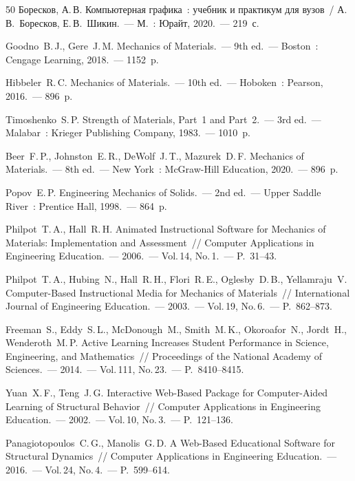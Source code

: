 \begin{thebibliography}{50}
Боресков, А.\,В. Компьютерная графика~: учебник и практикум для вузов~/
А.\,В.~Боресков, Е.\,В.~Шикин.~--- М.~: Юрайт, 2020.~--- 219~с.



Goodno~B.\,J., Gere~J.\,M. Mechanics of Materials.~---
9th ed.~--- Boston~: Cengage Learning, 2018.~--- 1152~p.

Hibbeler~R.\,C. Mechanics of Materials.~---
10th ed.~--- Hoboken~: Pearson, 2016.~--- 896~p.

Timoshenko~S.\,P. Strength of Materials, Part~1 and Part~2.~---
3rd ed.~--- Malabar~: Krieger Publishing Company, 1983.~--- 1010~p.

Beer~F.\,P., Johnston~E.\,R., DeWolf~J.\,T., Mazurek~D.\,F.
Mechanics of Materials.~---
8th ed.~--- New York~: McGraw-Hill Education, 2020.~--- 896~p.

Popov~E.\,P. Engineering Mechanics of Solids.~---
2nd ed.~--- Upper Saddle River~: Prentice Hall, 1998.~--- 864~p.


Philpot~T.\,A., Hall~R.\,H. Animated Instructional Software for Mechanics of Materials: Implementation and Assessment~/\!/
Computer Applications in Engineering Education.~---
2006.~--- Vol.\,14, No.\,1.~--- P.~31--43.

Philpot~T.\,A., Hubing~N., Hall~R.\,H., Flori~R.\,E., Oglesby~D.\,B., Yellamraju~V. Computer-Based Instructional Media for Mechanics of Materials~/\!/
International Journal of Engineering Education.~---
2003.~--- Vol.\,19, No.\,6.~--- P.~862--873.

Freeman~S., Eddy~S.\,L., McDonough~M., Smith~M.\,K., Okoroafor~N., Jordt~H., Wenderoth~M.\,P. Active Learning Increases Student Performance in Science, Engineering, and Mathematics~/\!/
Proceedings of the National Academy of Sciences.~---
2014.~--- Vol.\,111, No.\,23.~--- P.~8410--8415.

Yuan~X.\,F., Teng~J.\,G. Interactive Web-Based Package for Computer-Aided Learning of Structural Behavior~/\!/
Computer Applications in Engineering Education.~---
2002.~--- Vol.\,10, No.\,3.~--- P.~121--136.

Panagiotopoulos~C.\,G., Manolis~G.\,D. A Web-Based Educational Software for Structural Dynamics~/\!/
Computer Applications in Engineering Education.~---
2016.~--- Vol.\,24, No.\,4.~--- P.~599--614.


\end{thebibliography}

